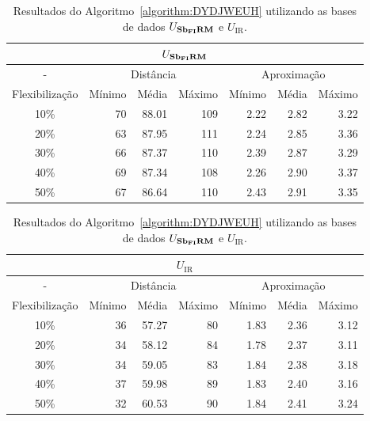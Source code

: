 \begin{table}[!htb]
  \caption{Resultados do Algoritmo~\ref{algorithm:DYDJWEUH} utilizando as bases de dados $U_{\textbf{Sb\textsubscript{FI}RM}}{}$ e $U_{\text{IR}}$.}
  \label{table:IEBGYPHS}
  \centering
  \begin{tabular}{|c|r|r|r|r|r|r|}
    \hline
    \multicolumn{7}{|c|}{$U_{\textbf{Sb\textsubscript{FI}RM}}{}$}                                                                      \\ \hline
      -            & \multicolumn{3}{c|}{Distância}             & \multicolumn{3}{c|}{Aproximação}           \\ \hline
    Flexibilização & Mínimo       & Média        & Máximo       & Mínimo       & Média        & Máximo       \\ \hline  
    10\%           & 70           & 88.01        & 109          & 2.22         & 2.82         & 3.22         \\ \hline
    20\%           & 63           & 87.95        & 111          & 2.24         & 2.85         & 3.36         \\ \hline
    30\%           & 66           & 87.37        & 110          & 2.39         & 2.87         & 3.29         \\ \hline
    40\%           & 69           & 87.34        & 108          & 2.26         & 2.90         & 3.37         \\ \hline
    50\%           & 67           & 86.64        & 110          & 2.43         & 2.91         & 3.35         \\ \hline    
  \end{tabular}

  \vspace{5mm}

  \begin{tabular}{|c|r|r|r|r|r|r|}
    \hline
    \multicolumn{7}{|c|}{$U_{\text{IR}}$}                                                                    \\ \hline
      -            & \multicolumn{3}{c|}{Distância}             & \multicolumn{3}{c|}{Aproximação}           \\ \hline
    Flexibilização & Mínimo       & Média        & Máximo       & Mínimo       & Média        & Máximo       \\ \hline  
    10\%           & 36           & 57.27        & 80           & 1.83         & 2.36         & 3.12         \\ \hline
    20\%           & 34           & 58.12        & 84           & 1.78         & 2.37         & 3.11         \\ \hline
    30\%           & 34           & 59.05        & 83           & 1.84         & 2.38         & 3.18         \\ \hline
    40\%           & 37           & 59.98        & 89           & 1.83         & 2.40         & 3.16         \\ \hline
    50\%           & 32           & 60.53        & 90           & 1.84         & 2.41         & 3.24         \\ \hline    
  \end{tabular}
\end{table}


